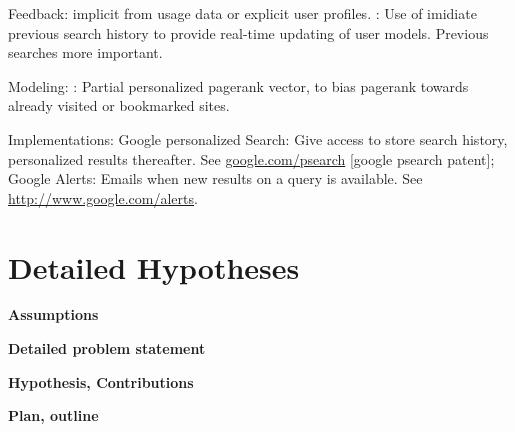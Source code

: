 Feedback: 
\cite[p9]{Micarelli2007} implicit from usage data or explicit user profiles. 
\cite{Shen2005}: Use of imidiate previous search history to provide real-time updating of user models. Previous searches more important.

Modeling:
\cite{Jeh2003}: Partial personalized pagerank vector, to bias pagerank towards already visited or bookmarked sites.

Implementations:
Google personalized Search: Give access to store search history, personalized results thereafter. See \url{google.com/psearch} [google psearch patent]; 
Google Alerts: Emails when new results on a query is available. See \url{http://www.google.com/alerts}.



\section{Detailed Hypotheses}

\textbf{Assumptions}

\textbf{Detailed problem statement}

\textbf{Hypothesis, Contributions}



\textbf{Plan, outline}
